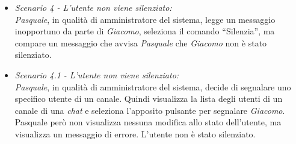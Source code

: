 \begin{itemize}
	\item \textit{Scenario 4 -  L’utente non viene silenziato:\\}
	\textit{Pasquale}, in qualità di amministratore del sistema, legge un messaggio inopportuno da parte di \textit{Giacomo}, seleziona il comando “Silenzia”, ma compare un messaggio che avvisa \textit{Pasquale} che \textit{Giacomo} non è stato silenziato.\\
	
	\item \textit{Scenario 4.1 -  L’utente non viene silenziato:\\}
	\textit{Pasquale}, in qualità di amministratore del sistema, decide di segnalare uno specifico utente di un canale. Quindi visualizza la lista degli utenti di un canale di una \textit{chat} e seleziona l’apposito pulsante per segnalare \textit{Giacomo}. Pasquale però non visualizza nessuna modifica allo stato dell’utente, ma visualizza un messaggio di errore. L’utente non è stato silenziato.\\ 
\end{itemize}

